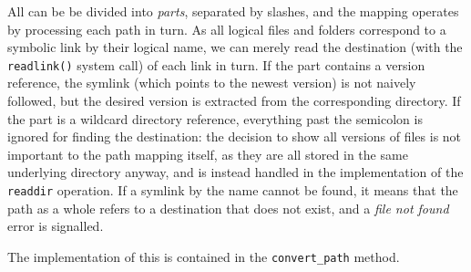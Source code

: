 \documentclass[12pt]{article}
\begin{document}
All can be be divided into \textit{parts}, separated by slashes, and
the mapping operates by processing each path in turn.  As all logical
files and folders correspond to a symbolic link by their logical name,
we can merely read the destination (with the \texttt{readlink()}
system call) of each link in turn.  If the part contains a version
reference, the symlink (which points to the newest version) is not
naively followed, but the desired version is extracted from the
corresponding directory.  If the part is a wildcard directory
reference, everything past the semicolon is ignored for finding the
destination: the decision to show all versions of files is not
important to the path mapping itself, as they are all stored in the
same underlying directory anyway, and is instead handled in the
implementation of the \texttt{readdir} operation. If a symlink by the
name cannot be found, it means that the path as a whole refers to a
destination that does not exist, and a \textit{file not found} error
is signalled.

The implementation of this is contained in the \texttt{convert\_path}
method.
\end{document}
